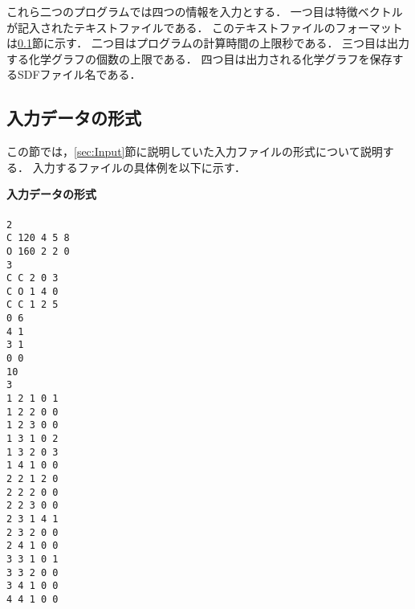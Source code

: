 \documentclass[11pt,titlepage,dvipdfmx,twoside]{jarticle}
\begin{document}
これら二つのプログラムでは四つの情報を入力とする．
一つ目は特徴ベクトルが記入されたテキストファイルである．
このテキストファイルのフォーマットは\ref{sec:InputFormat}節に示す．
二つ目はプログラムの計算時間の上限秒である．
三つ目は出力する化学グラフの個数の上限である．
四つ目は出力される化学グラフを保存するSDFファイル名である．

\bigskip

\newpage
\subsection{入力データの形式}
\label{sec:InputFormat}

この節では，\ref{sec:Input}節に説明していた入力ファイルの形式について説明する．
入力するファイルの具体例を以下に示す．

\bigskip

\begin{oframed}
{\bf 入力データの形式}\\\\
{\tt 2\\
C 120 4 5 8\\
O 160 2 2 0\\
3\\
C C 2 0 3\\
C O 1 4 0\\
C C 1 2 5\\
0 6\\
4 1\\
3 1\\
0 0\\
10\\
3\\
1 2 1 0 1\\
1 2 2 0 0\\
1 2 3 0 0\\
1 3 1 0 2\\
1 3 2 0 3\\
1 4 1 0 0\\
2 2 1 2 0\\
2 2 2 0 0\\
2 2 3 0 0\\
2 3 1 4 1\\
2 3 2 0 0\\
2 4 1 0 0\\
3 3 1 0 1\\
3 3 2 0 0\\
3 4 1 0 0\\
4 4 1 0 0\\}
\end{oframed}
\end{document}
